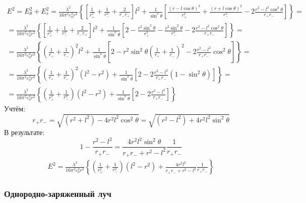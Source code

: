 \[
	\begin{gathered}
	E^2 = E_\theta^2 + E_r^2 =
	\frac{\lambda^2}{16\pi^2\varepsilon_0^2 r^2} 
	\left\{\left[
	\frac{1}{r_+^2}
	+
	\frac{1}{r_-^2}
	+
	\frac{2}{r_- r_+}
	\right] l^2 +
	\frac{1}{\sin^2 \theta}\left[
	\frac{(r - l \cos \theta)^2}{r_+^2}
	+ \frac{(r + l \cos \theta)^2}{r_-^2}
	- 2 \frac{r^2 - l^2 \cos^2 \theta}{r_+ r_-}
	\right]
	\right\}
	= \\ =
	\frac{\lambda^2}{16\pi^2\varepsilon_0^2 r^2} 
	\left\{\left[
	\frac{1}{r_+^2}
	+
	\frac{1}{r_-^2}
	+
	\frac{2}{r_- r_+}
	\right] l^2 +
	\frac{1}{\sin^2 \theta}\left[
	2 - \frac{r^2 \sin^2 \theta}{r_+^2}
	- \frac{r^2 \sin^2 \theta}{r_-^2}
	- 2 \frac{r^2 - l^2 \cos^2 \theta}{r_+ r_-}
	\right]
	\right\}
	= \\ =
	\frac{\lambda^2}{16\pi^2\varepsilon_0^2 r^2} 
	\left\{
	\left(\frac{1}{r_+} + \frac{1}{r_-} \right)^2 l^2 +
	\frac{1}{\sin^2 \theta}\left[
	2 - r^2 \sin^2 \theta \left(\frac{1}{r_+} + \frac{1}{r_-} \right)^2
	- 2 \frac{r^2 - l^2}{r_+ r_-} \cos^2 \theta
	\right]
	\right\}
	= \\ =
	\frac{\lambda^2}{16\pi^2\varepsilon_0^2 r^2} 
	\left\{
	\left(\frac{1}{r_+} + \frac{1}{r_-} \right)^2 (l^2 - r^2) +
	\frac{1}{\sin^2 \theta}\left[
	2 
	- 2 \frac{r^2 - l^2}{r_+ r_-} (1 - \sin^2 \theta)
	\right]
	\right\}
	= \\ =
	\frac{\lambda^2}{16\pi^2\varepsilon_0^2 r^2} 
	\left\{
	\left(\frac{1}{r_+^2} + \frac{1}{r_-^2} \right) (l^2 - r^2) +
	\frac{1}{\sin^2 \theta}\left[
	2 
	- 2 \frac{r^2 - l^2}{r_+ r_-}
	\right]
	\right\}
	\end{gathered}
\]
Учтём:
\[
	r_+ r_- = \sqrt{(r^2 + l^2) - 4 r^2 l^2 \cos^2 \theta} = \sqrt{(r^2 - l^2) + 4 r^2 l^2 \sin^2 \theta}
\]
В результате:
\[
	1 - \frac{r^2 - l^2}{r_+ r_-} = \frac{4 r^2 l^2 \sin^2 \theta}{r_+ r_- + r^2 - l^2} \frac{1}{r_+ r_-}
\]
\[
	\begin{gathered}
	E^2 = 
	\frac{\lambda^2}{16\pi^2\varepsilon_0^2 r^2} 
	\left\{
	\left(\frac{1}{r_+^2} + \frac{1}{r_-^2} \right) (l^2 - r^2) +
	\frac{4 r^2 l^2}{r_+ r_- + r^2 - l^2} \frac{1}{r_+ r_-}
	\right\}
	\end{gathered}
\]
\subsubsection{Однородно-заряженный луч}

